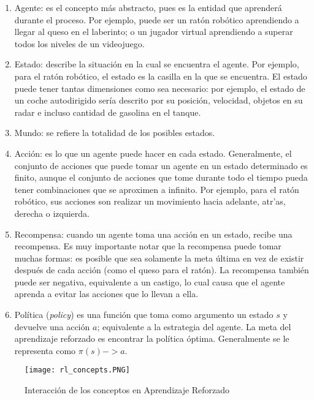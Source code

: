 \begin{enumerate}
    \item Agente: es el concepto m\'as abstracto, pues es la entidad que aprender\'a durante el proceso. Por ejemplo, puede ser un rat\'on rob\'otico aprendiendo a llegar al queso en el laberinto; o un jugador virtual aprendiendo a superar todos los niveles de un videojuego.
    \item Estado: describe la situaci\'on en la cual se encuentra el agente. Por ejemplo, para el rat\'on rob\'otico, el estado es la casilla en la que se encuentra. El estado puede tener tantas dimensiones como sea necesario: por ejemplo, el estado de un coche autodirigido ser\'ia descrito por su posici\'on, velocidad, objetos en su radar e incluso cantidad de gasolina en el tanque.
    \item Mundo: se refiere la totalidad de los posibles estados.
    \item Acci\'on: es lo que un agente puede hacer en cada estado. Generalmente, el conjunto de acciones que puede tomar un agente en un estado determinado es finito, aunque el conjunto de acciones que tome durante todo el tiempo pueda tener combinaciones que se aproximen a infinito. Por ejemplo, para el rat\'on rob\'otico, sus acciones son realizar un movimiento hacia adelante, atr'as, derecha o izquierda.
    \item Recompensa: cuando un agente toma una acci\'on en un estado, recibe una recompensa. Es muy importante notar que la recompensa puede tomar muchas formas: es posible que sea solamente la meta \'ultima en vez de existir despu\'es de cada acci\'on (como el queso para el rat\'on). La recompensa tambi\'en puede ser negativa, equivalente a un castigo, lo cual causa que el agente aprenda a evitar las acciones que lo llevan a ella.
    \item Pol\'itica (\textit{policy}) es una funci\'on que toma como argumento un estado $s$ y devuelve una acci\'on $a$; equivalente a la estrategia del agente. La meta del aprendizaje reforzado es encontrar la pol\'itica \'optima. Generalmente se le representa como $\pi(s)->a$.
\end{enumerate}

\begin{figure}[ht]
\caption{Interacci\'on de los conceptos en Aprendizaje Reforzado}
\label{rl_concepts}
\texttt{[image: rl\_concepts.PNG]}
\centering
\end{figure}

